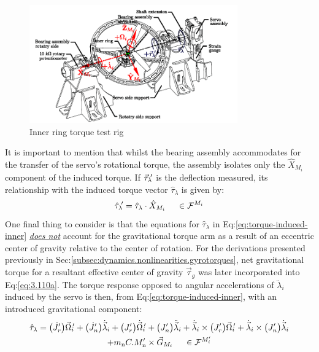 \begin{figure}[htpb]
\centering
\includegraphics[width=0.8\textwidth]{figs/torque-inner}
\caption{Inner ring torque test rig}
\label{fig:torque-inner}
\vspace{-8pt}
\end{figure}
\par
It is important to mention that whilst the bearing assembly accommodates for the transfer of the servo's rotational torque, the assembly isolates only the $\hat{X}_{M_i}$ component of the induced torque. If $\vec{\tau}_{\lambda}\text{}\hspace{-2pt}'$ is the deflection measured, its relationship with the induced torque vector $\hat{\tau}_{\lambda}$ is given by:
\begin{equation}
\hat{\tau}_{\lambda}\text{}\hspace{-2pt}'=\hat{\tau}_{\lambda}\cdot\hat{X}_{M_i}~~~~\in\mathcal{F}^{M_i}
\end{equation}
One final thing to consider is that the equations for $\hat{\tau}_\lambda$ in Eq:\ref{eq:torque-induced-inner} \underline{\emph{does not}} account for the gravitational torque arm as a result of an eccentric center of gravity relative to the center of rotation. For the derivations presented previously in Sec:\ref{subsec:dynamics.nonlinearities.gyrotorques}, net gravitational torque for a resultant effective center of gravity $\vec{\tau}_g$ was later incorporated into Eq:\ref{eq:3.110a}. The torque response opposed to angular accelerations of $\ddot{\lambda}_i$ induced by the servo is then, from Eq:\ref{eq:torque-induced-inner}, with an introduced gravitational component:
\begin{multline}\label{eq:model-inner}
\hat{\tau}_\lambda=\big(\dot{J}_{r}'\big)\vec{\Omega}_i\text{}\hspace{-2pt}'+\big(\dot{J}_{n}'\big)\dot{\vec{\lambda}}_i+\big(J_r'\big)\dot{\vec{\Omega}}_i\text{}\hspace{-2pt}'+\big(J_{n}'\big)\ddot{\vec{\lambda}}_i+\dot{\vec{\lambda}}_i\times \big(J_r'\big)\vec{\Omega}_i\text{}\hspace{-2pt}'+\dot{\vec{\lambda}}_i\times \big(J_{n}'\big)\dot{\vec{\lambda}}_i
\\
+m_\text{n}C.M'_{\text{n}}\times\vec{G}_{M_i}~~~~\in\mathcal{F}^{M_i'}
\end{multline}
